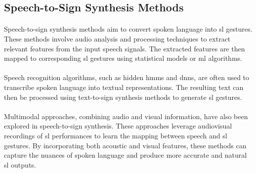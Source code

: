 \subsection{Speech-to-Sign Synthesis Methods}
\paragraph{}
Speech-to-sign synthesis methods aim to convert spoken language into \ac{sl} gestures. These methods involve audio analysis and processing techniques to extract relevant features from the input speech signals. The extracted features are then mapped to corresponding \ac{sl} gestures using statistical models or \ac{ml} algorithms.
\paragraph{}
Speech recognition algorithms, such as hidden \ac{hmm}s and \ac{dnn}s, are often used to transcribe spoken language into textual representations. The resulting text can then be processed using text-to-sign synthesis methods to generate \ac{sl} gestures.
\paragraph{}
Multimodal approaches, combining audio and visual information, have also been explored in speech-to-sign synthesis. These approaches leverage audiovisual recordings of \ac{sl} performances to learn the mapping between speech and \ac{sl} gestures. By incorporating both acoustic and visual features, these methods can capture the nuances of spoken language and produce more accurate and natural \ac{sl} outputs.
